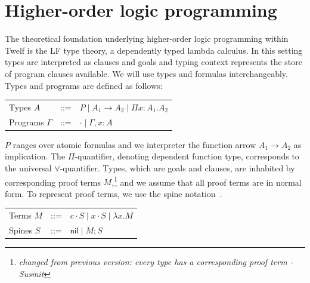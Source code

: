 \documentclass{acmconf}
\newcommand{\comb}{\cdot}
\newcommand{\nil}{\mathsf{nil}}
\newcommand{\ednote}[1]{\footnote{\it #1}}
\begin{document}
\section{Higher-order logic programming}\label{sec:twelf}


The theoretical foundation underlying higher-order logic programming
within Twelf is the LF type theory, a dependently typed lambda
calculus. In this setting types are interpreted as clauses and goals and
typing context represents the store of program clauses available. We
will use types and formulas interchangeably. Types and programs are
defined as follows: 

\begin{center}
\begin{tabular}[h]{lcl}
Types  $A$ & ::= & $P \mid  A_1 \rightarrow A_2 \mid \Pi x:A_1.A_2$ \\
Programs  $\Gamma$ & ::= & $\cdot \mid \Gamma, x:A$ 
\end{tabular}
\end{center}

$P$ ranges over atomic formulas and we interpreter the function arrow
$A_1 \rightarrow A_2$ as implication. The $\Pi$-quantifier, denoting
dependent function type, corresponds to the universal
$\forall$-quantifier. Types, which are goals and clauses, are
inhabited by corresponding proof terms $M$,\ednote{changed from
previous version: every type has a corresponding proof term - Susmit}
and we assume that all proof terms are in normal form. To represent
proof terms, we use the spine notation~\cite{CervesatoPfenning01}.

\begin{center}
\begin{tabular}[h]{lcl}
Terms  $M$ & ::= & $c \comb S \mid x \comb S \mid \lambda x. M $  \\ 
Spines $S$ & ::= & $\nil \mid M;S\;$
\end{tabular}
\end{center}
\end{document}
